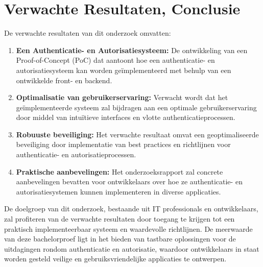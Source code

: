 \section{Verwachte Resultaten, Conclusie}%
\label{sec:verwachte_resultaten}

De verwachte resultaten van dit onderzoek omvatten:

\begin{enumerate}
    \item \textbf{Een Authenticatie- en Autorisatiesysteem:} 
    De ontwikkeling van een Proof-of-Concept (PoC) dat aantoont hoe een authenticatie- en autorisatiesysteem kan worden geïmplementeerd met 
    behulp van een ontwikkelde front- en backend.

    \item \textbf{Optimalisatie van gebruikerservaring:} 
    Verwacht wordt dat het geïmplementeerde systeem zal bijdragen aan een optimale gebruikerservaring door middel van intuïtieve interfaces en 
    vlotte authenticatieprocessen.

    \item \textbf{Robuuste beveiliging:} 
    Het verwachte resultaat omvat een geoptimaliseerde beveiliging door implementatie van best practices en richtlijnen voor authenticatie- en 
    autorisatieprocessen.

    \item \textbf{Praktische aanbevelingen:}
    Het onderzoeksrapport zal concrete aanbevelingen bevatten voor ontwikkelaars over hoe ze authenticatie- en autorisatiesystemen kunnen 
    implementeren in diverse applicaties.
\end{enumerate}

De doelgroep van dit onderzoek, bestaande uit IT professionals en ontwikkelaars, zal profiteren van de verwachte resultaten door toegang te krijgen 
tot een praktisch implementeerbaar systeem en waardevolle richtlijnen. De meerwaarde van deze bachelorproef ligt in het bieden van tastbare 
oplossingen voor de uitdagingen rondom authenticatie en autorisatie, waardoor ontwikkelaars in staat worden gesteld veilige en gebruiksvriendelijke 
applicaties te ontwerpen.

